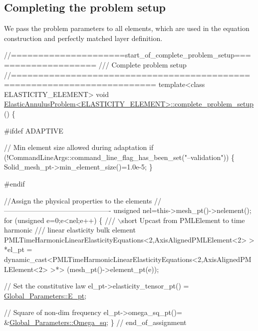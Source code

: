 

\hypertarget{index_complete_setup}{}\subsection{Completing the problem setup}\label{index_complete_setup}
We pass the problem parameters to all elements, which are used in the equation construction and perfectly matched layer definition.

 
\begin{DoxyCodeInclude}
\textcolor{comment}{//=====================start\_of\_complete\_problem\_setup====================}
\textcolor{comment}{/// Complete problem setup}
\textcolor{comment}{}\textcolor{comment}{//========================================================================}
\textcolor{keyword}{template}<\textcolor{keyword}{class} ELASTICITY\_ELEMENT>
\textcolor{keywordtype}{void} \hyperlink{classElasticAnnulusProblem_a06d509ff3316e5f3072ad5f9144cc33f}{ElasticAnnulusProblem<ELASTICITY\_ELEMENT>::complete\_problem\_setup}
      ()
\{

\textcolor{preprocessor}{#ifdef ADAPTIVE}

 \textcolor{comment}{// Min element size allowed during adaptation}
 \textcolor{keywordflow}{if} (!CommandLineArgs::command\_line\_flag\_has\_been\_set(\textcolor{stringliteral}{"--validation"}))
  \{   
   Solid\_mesh\_pt->min\_element\_size()=1.0e-5; 
  \}

\textcolor{preprocessor}{#endif}

 \textcolor{comment}{//Assign the physical properties to the elements}
 \textcolor{comment}{//----------------------------------------------}
 \textcolor{keywordtype}{unsigned} nel=this->mesh\_pt()->nelement();
 \textcolor{keywordflow}{for} (\textcolor{keywordtype}{unsigned} e=0;e<nel;e++)
  \{     \textcolor{comment}{}
\textcolor{comment}{   /// \(\backslash\)short Upcast from PMLElement to time harmonic }
\textcolor{comment}{   /// linear elasticity bulk element}
\textcolor{comment}{}   PMLTimeHarmonicLinearElasticityEquations<2,AxisAlignedPMLElement<2> > *el\_pt = 
    \textcolor{keyword}{dynamic\_cast<}PMLTimeHarmonicLinearElasticityEquations<2,AxisAlignedPMLElement<2> \textcolor{keyword}{>}*>
    (mesh\_pt()->element\_pt(e));
   
   \textcolor{comment}{// Set the constitutive law}
   el\_pt->elasticity\_tensor\_pt() = \hyperlink{namespaceGlobal__Parameters_a9dc0631434879b47501f64851ad679b8}{Global\_Parameters::E\_pt};
   
   \textcolor{comment}{// Square of non-dim frequency}
   el\_pt->omega\_sq\_pt()= &\hyperlink{namespaceGlobal__Parameters_af9e1e178dfb7f5e35b452599bd4c4324}{Global\_Parameters::Omega\_sq};
  \} \textcolor{comment}{// end\_of\_assignment                        }

\end{DoxyCodeInclude}


